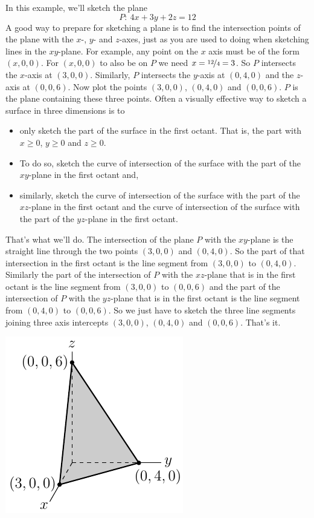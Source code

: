 \begin{eg}\label{eg:VPsketchPlane}
In this example, we'll sketch the plane 
\begin{equation*}
P:\ 4x + 3y + 2z = 12
\end{equation*}
A good way to prepare for sketching a plane is to find the intersection 
points of the plane with the $x$-, $y$- and $z$-axes, just as you are used 
to doing when sketching lines in the $xy$-plane. For example, 
any point on the $x$ axis must be of the form $(x,0,0)$. For $(x,0,0)$ 
to also be on $P$ we need $x=\nicefrac{12}{4}=3$. So $P$ intersects 
the $x$-axis at $(3,0,0)$. Similarly, $P$ intersects the $y$-axis 
at $(0,4,0)$ and the $z$-axis at $(0,0,6)$. Now plot the points 
$(3,0,0)$, $(0,4,0)$ and $(0,0,6)$. $P$ is the plane containing these 
three points. 
Often a visually effective way to sketch a surface in three dimensions
is to 
\begin{itemize}
\item only sketch the part of the surface in the first octant. That is,
the part with $x\ge0$, $y\ge 0$ and $z\ge 0$.
\item To do so, sketch the curve of intersection of the surface with
the part of the $xy$-plane in the first octant and,
\item similarly, sketch the curve of intersection of the surface with
the part of the $xz$-plane in the first octant and
the curve of intersection of the surface with
the part of the $yz$-plane in the first octant.

\end{itemize}
That's what we'll do. The intersection of the plane $P$ with the $xy$-plane
is the straight line through the two points $(3,0,0)$ and $(0,4,0)$. So
the part of that intersection in the first octant is the line segment
from $(3,0,0)$ to $(0,4,0)$. Similarly the part of the intersection of
$P$ with the $xz$-plane that is in the first octant is the line segment
from $(3,0,0)$ to $(0,0,6)$ and  the part of the intersection of
$P$ with the $yz$-plane that is in the first octant is the line segment
from $(0,4,0)$ to $(0,0,6)$. So we just have to sketch the three line segments
joining three axis intercepts $(3,0,0)$, $(0,4,0)$ and $(0,0,6)$.
That's it.

\begin{efig}
\begin{center}
   \includegraphics{planeSketch.pdf}
\end{center}
\end{efig}
\end{eg}

